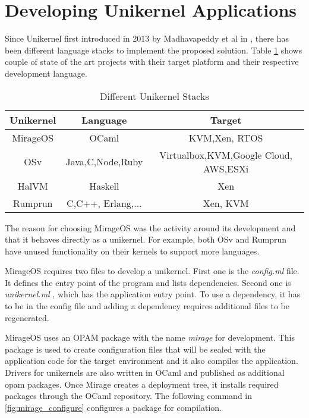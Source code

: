 
\section{Developing Unikernel Applications}

Since Unikernel first introduced in 2013 by Madhavapeddy et al in \cite{library-operating-system}, there has been different language stacks to implement the proposed solution. Table \ref{tab:stacks} shows couple of state of the art projects with their target platform and their respective development language.

\begin{table}[htpb]
    \caption[Different Unikernel Stacks]{Different Unikernel Stacks}\label{tab:stacks}
    \centering
    \begin{tabular}{ |c |c |c| }
      \toprule
        Unikernel & Language & Target \\
      \midrule
        MirageOS & OCaml & KVM,Xen, RTOS \\
        \hline
        OSv & Java,C,Node,Ruby & Virtualbox,KVM,Google Cloud, AWS,ESXi \\
        \hline
        HalVM & Haskell & Xen \\
      \hline
        Rumprun & C,C++, Erlang,... &  Xen, KVM \\
      \bottomrule
    \end{tabular}
  \end{table}

The reason for choosing MirageOS was the activity around its development and that it behaves directly as a unikernel. For example, both OSv and Rumprun have unused functionality on their kernels to support more languages.

MirageOS requires two files to develop a unikernel. First one is the \textit{config.ml} file. It defines the entry point of the program and lists dependencies. Second one is \textit{unikernel.ml} , which has the application entry point. To use a dependency, it has to be in the config file and adding a dependency requires additional files to be regenerated.

MirageOS uses an OPAM package with the name \textit{mirage} \cite{opammirage} for development. This package is used to create configuration files that will be sealed with the application code for the target environment and it also compiles the application. Drivers for unikernels are also written in OCaml and published as additional opam packages. Once Mirage creates a deployment tree, it installs required packages through the OCaml repository. The following command in \ref{fig:mirage_configure} configures a package for compilation.


